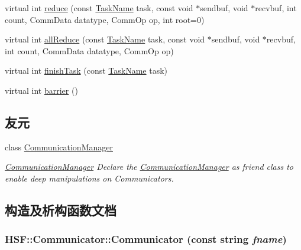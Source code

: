 \begin{DoxyCompactItemize}
\item 
virtual int \hyperlink{classHSF_1_1Communicator_a17438ea5cd35f2ae41f48a2abfa1838f}{reduce} (const \hyperlink{namespaceHSF_a928eb958edfcd09f62de19e9cd3bac70}{TaskName} task, const void $\ast$sendbuf, void $\ast$recvbuf, int count, CommData datatype, CommOp op, int root=0)
\item 
virtual int \hyperlink{classHSF_1_1Communicator_aa89f31910f7d7f51549ef73acde75236}{allReduce} (const \hyperlink{namespaceHSF_a928eb958edfcd09f62de19e9cd3bac70}{TaskName} task, const void $\ast$sendbuf, void $\ast$recvbuf, int count, CommData datatype, CommOp op)
\item 
virtual int \hyperlink{classHSF_1_1Communicator_afd2efabdf9dc5461641311337c36b12f}{finishTask} (const \hyperlink{namespaceHSF_a928eb958edfcd09f62de19e9cd3bac70}{TaskName} task)
\item 
virtual int \hyperlink{classHSF_1_1Communicator_a268366a86ccbb00d630b9b660a02b7c2}{barrier} ()
\end{DoxyCompactItemize}
\subsection*{友元}
\begin{DoxyCompactItemize}
\item 
class \hyperlink{classHSF_1_1Communicator_a24b77c60a7c2901833ba7bf4e02540c7}{CommunicationManager}
\begin{DoxyCompactList}\small\item\em \hyperlink{classHSF_1_1CommunicationManager}{CommunicationManager} Declare the \hyperlink{classHSF_1_1CommunicationManager}{CommunicationManager} as friend class to enable deep manipulations on Communicators. \item\end{DoxyCompactList}\end{DoxyCompactItemize}


\subsection{构造及析构函数文档}
\hypertarget{classHSF_1_1Communicator_a3d860a8bbf699d64805747144fc4e53b}{
\subsubsection[{Communicator}]{\setlength{\rightskip}{0pt plus 5cm}HSF::Communicator::Communicator (const string {\em fname})}}
\label{classHSF_1_1Communicator_a3d860a8bbf699d64805747144fc4e53b}


